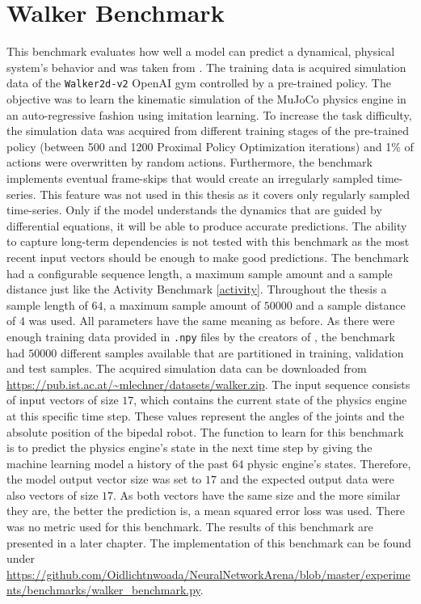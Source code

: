 \documentclass[draft,final]{vutinfth} %
\begin{document}
    \section{Walker Benchmark} \label{walker}
    This benchmark evaluates how well a model can predict a dynamical, physical system's behavior and was taken from \cite{ODELSTM}.
    The training data is acquired simulation data of the \texttt{Walker2d-v2} OpenAI gym \cite{OpenAIGym} controlled by a pre-trained policy.
    The objective was to learn the kinematic simulation of the MuJoCo physics engine \cite{MuJoCo} in an auto-regressive fashion using imitation learning.
    To increase the task difficulty, the simulation data was acquired from different training stages of the pre-trained policy (between 500 and 1200 Proximal Policy Optimization iterations) and 1\% of actions were overwritten by random actions.
    Furthermore, the benchmark implements eventual frame-skips that would create an irregularly sampled time-series. 
    This feature was not used in this thesis as it covers only regularly sampled time-series.
    Only if the model understands the dynamics that are guided by differential equations, it will be able to produce accurate predictions.
    The ability to capture long-term dependencies is not tested with this benchmark as the most recent input vectors should be enough to make good predictions.
    The benchmark had a configurable sequence length, a maximum sample amount and a sample distance just like the Activity Benchmark \ref{activity}.
    Throughout the thesis a sample length of $64$, a maximum sample amount of $50000$ and a sample distance of $4$ was used.
    All parameters have the same meaning as before.
    As there were enough training data provided in \texttt{.npy} files by the creators of \cite{ODELSTM}, the benchmark had $50000$ different samples available that are partitioned in training, validation and test samples.
    The acquired simulation data can be downloaded from \url{https://pub.ist.ac.at/~mlechner/datasets/walker.zip}.
    The input sequence consists of input vectors of size $17$, which contains the current state of the physics engine at this specific time step.
    These values represent the angles of the joints and the absolute position of the bipedal robot.
    The function to learn for this benchmark is to predict the physics engine's state in the next time step by giving the machine learning model a history of the past $64$ physic engine's states.
    Therefore, the model output vector size was set to $17$ and the expected output data were also vectors of size $17$.
    As both vectors have the same size and the more similar they are, the better the prediction is, a mean squared error loss was used.
    There was no metric used for this benchmark.
    The results of this benchmark are presented in a later chapter.
    The implementation of this benchmark can be found under \url{https://github.com/Oidlichtnwoada/NeuralNetworkArena/blob/master/experiments/benchmarks/walker_benchmark.py}.
\end{document}
